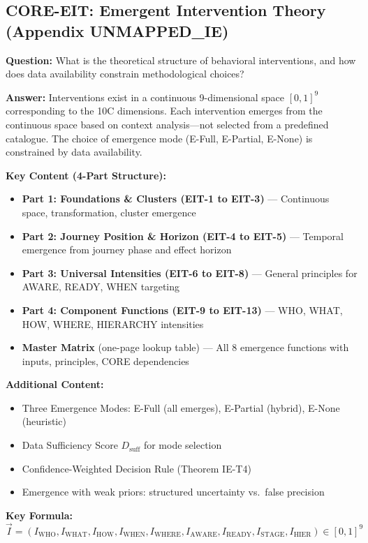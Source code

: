 \subsection{CORE-EIT: Emergent Intervention Theory (Appendix UNMAPPED_IE)}

\begin{tcolorbox}[colback=gray!5!white, colframe=gray!75!black]
\textbf{Question:} What is the theoretical structure of behavioral interventions, and how does data availability constrain methodological choices?

\textbf{Answer:} Interventions exist in a continuous 9-dimensional space $[0,1]^9$ corresponding to the 10C dimensions. Each intervention emerges from the continuous space based on context analysis---not selected from a predefined catalogue. The choice of emergence mode (E-Full, E-Partial, E-None) is constrained by data availability.

\textbf{Key Content (4-Part Structure):}
\begin{itemize}[nosep]
\item \textbf{Part 1: Foundations \& Clusters (EIT-1 to EIT-3)} --- Continuous space, transformation, cluster emergence
\item \textbf{Part 2: Journey Position \& Horizon (EIT-4 to EIT-5)} --- Temporal emergence from journey phase and effect horizon
\item \textbf{Part 3: Universal Intensities (EIT-6 to EIT-8)} --- General principles for AWARE, READY, WHEN targeting
\item \textbf{Part 4: Component Functions (EIT-9 to EIT-13)} --- WHO, WHAT, HOW, WHERE, HIERARCHY intensities
\item \textbf{Master Matrix} (one-page lookup table) --- All 8 emergence functions with inputs, principles, CORE dependencies
\end{itemize}

\textbf{Additional Content:}
\begin{itemize}[nosep]
\item Three Emergence Modes: E-Full (all emerges), E-Partial (hybrid), E-None (heuristic)
\item Data Sufficiency Score $D_{\text{suff}}$ for mode selection
\item Confidence-Weighted Decision Rule (Theorem IE-T4)
\item Emergence with weak priors: structured uncertainty vs.\ false precision
\end{itemize}

\textbf{Key Formula:}
\begin{equation}
\vec{I} = (I_{\text{WHO}}, I_{\text{WHAT}}, I_{\text{HOW}}, I_{\text{WHEN}}, I_{\text{WHERE}}, I_{\text{AWARE}}, I_{\text{READY}}, I_{\text{STAGE}}, I_{\text{HIER}}) \in [0,1]^9
\end{equation}


\end{tcolorbox}
